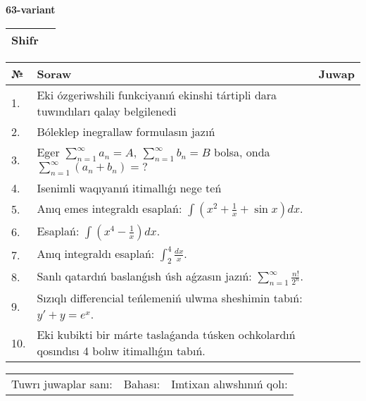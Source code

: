 \documentclass{article}
\begin{document}
  \egroup
  
  \newpage
  
  
  \textbf{63-variant}\\
  
  \bgroup
  \def\arraystretch{1.6} %
  
  \begin{tabular}{|m{5.7cm}|m{9.5cm}|}
  \hline
  Shifr & \\
  \hline
  \end{tabular}
  
  \vspace{1cm}
  
  \begin{tabular}{|m{0.7cm}|m{10cm}|m{4cm}|}
  \hline
  № & Soraw & Juwap \\
  \hline
  1. & Eki ózgeriwshili funkciyanıń ekinshi tártipli dara tuwındıları qalay belgilenedi &  \\
  \hline
  2. & Bóleklep inegrallaw formulasın jazıń &  \\
  \hline
  3. & Eger \(\sum_{n = 1}^{\infty}a_{n} = A,\ \sum_{n = 1}^{\infty}b_{n} = B\) bolsa, onda \(\sum_{n = 1}^{\infty}\left( a_{n} + b_{n} \right) = ?\) &  \\
  \hline
  4. & Isenimli waqıyanıń itimallıǵı nege teń &  \\
  \hline
  5. & Anıq emes integraldı esaplań: \(\int{\left( x^2  + \frac{1}{x} + \sin x \right)dx}\). &  \\
  \hline
  6. & Esaplań: \(\int\left( x^{4} - \frac{1}{x} \right)dx\). &  \\
  \hline
  7. & Anıq integraldı esaplań: \(\int_{2}^{4}\frac{dx}{x}\). &  \\
  \hline
  8. & Sanlı qatardıń baslanǵısh úsh aǵzasın jazıń: \(\sum_{n = 1}^{\infty}\frac{n!}{2^{n}}\). &  \\
  \hline
  9. & Sızıqlı differencial teńlemeniń ulwma sheshimin tabıń: \(y' + y = e^{x}\). &  \\
  \hline
  10. & Eki kubikti bir márte taslaǵanda túsken ochkolardıń qosındısı 4 bolıw itimallıǵın tabıń. &  \\
  \hline
  \end{tabular}
  
  \vspace{1cm}
  
  \begin{tabular}{lll}
  Tuwrı juwaplar sanı: \underline{\hspace{1.5cm}} & 
  Bahası: \underline{\hspace{1.5cm}} & 
  Imtixan alıwshınıń qolı: \underline{\hspace{2cm}} \\
  \end{tabular}
  
\end{document}
